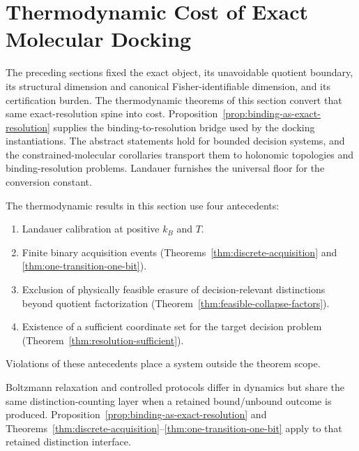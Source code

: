 \section{Thermodynamic Cost of Exact Molecular Docking}\label{main-theorems}

The preceding sections fixed the exact object, its unavoidable quotient boundary, its structural dimension and canonical Fisher-identifiable dimension, and its certification burden. The thermodynamic theorems of this section convert that same exact-resolution spine into cost. Proposition~\ref{prop:binding-as-exact-resolution} supplies the binding-to-resolution bridge used by the docking instantiations. The abstract statements hold for bounded decision systems, and the constrained-molecular corollaries transport them to holonomic topologies and binding-resolution problems. Landauer furnishes the universal floor for the conversion constant.

\begin{remark}\label{rem:thermo-antecedents}
The thermodynamic results in this section use four antecedents:
\begin{enumerate}
\item Landauer calibration at positive $k_B$ and $T$.
\item Finite binary acquisition events (Theorems~\ref{thm:discrete-acquisition} and \ref{thm:one-transition-one-bit}).
\item Exclusion of physically feasible erasure of decision-relevant distinctions beyond quotient factorization (Theorem~\ref{thm:feasible-collapse-factors}).
\item Existence of a sufficient coordinate set for the target decision problem (Theorem~\ref{thm:resolution-sufficient}).
\end{enumerate}
Violations of these antecedents place a system outside the theorem scope.
\end{remark}

\begin{remark}\label{rem:relaxational-binding-interface}
Boltzmann relaxation and controlled protocols differ in dynamics but share the same distinction-counting layer when a retained bound/unbound outcome is produced. Proposition~\ref{prop:binding-as-exact-resolution} and Theorems~\ref{thm:discrete-acquisition}--\ref{thm:one-transition-one-bit} apply to that retained distinction interface.
\end{remark}


